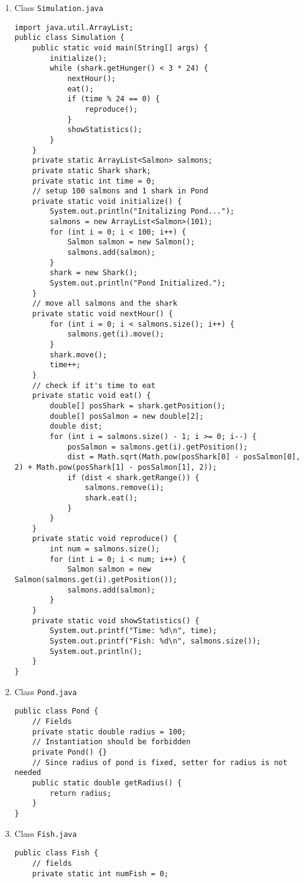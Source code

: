 \begin{enumerate}
\item Class \texttt{Simulation.java}
\lstset{language=java, tabsize=2}
\begin{lstlisting}
import java.util.ArrayList;
public class Simulation {
	public static void main(String[] args) {
		initialize();
		while (shark.getHunger() < 3 * 24) {
			nextHour();
			eat();
			if (time % 24 == 0) {
				reproduce();
			}
			showStatistics();
		}
	}
	private static ArrayList<Salmon> salmons;
	private static Shark shark;
	private static int time = 0;
	// setup 100 salmons and 1 shark in Pond
	private static void initialize() {
		System.out.println("Initalizing Pond...");
		salmons = new ArrayList<Salmon>(101);
		for (int i = 0; i < 100; i++) {
			Salmon salmon = new Salmon();
			salmons.add(salmon);
		}
		shark = new Shark();
		System.out.println("Pond Initialized.");
	}
	// move all salmons and the shark
	private static void nextHour() {
		for (int i = 0; i < salmons.size(); i++) {
			salmons.get(i).move();
		}
		shark.move();
		time++;
	}
	// check if it's time to eat
	private static void eat() {
		double[] posShark = shark.getPosition();
		double[] posSalmon = new double[2];
		double dist;
		for (int i = salmons.size() - 1; i >= 0; i--) {
			posSalmon = salmons.get(i).getPosition();
			dist = Math.sqrt(Math.pow(posShark[0] - posSalmon[0], 2) + Math.pow(posShark[1] - posSalmon[1], 2));
			if (dist < shark.getRange()) {
				salmons.remove(i);
				shark.eat();
			}
		}
	}
	private static void reproduce() {
		int num = salmons.size();
		for (int i = 0; i < num; i++) {
			Salmon salmon = new Salmon(salmons.get(i).getPosition());
			salmons.add(salmon);
		}
	}
	private static void showStatistics() {
		System.out.printf("Time: %d\n", time);
		System.out.printf("Fish: %d\n", salmons.size());
		System.out.println();
	}
}
\end{lstlisting}
\item Class \texttt{Pond.java}
\lstset{language=java, tabsize=2}
\begin{lstlisting}
public class Pond {
	// Fields
	private static double radius = 100;
	// Instantiation should be forbidden
	private Pond() {}
	// Since radius of pond is fixed, setter for radius is not needed
	public static double getRadius() {
		return radius;
	}
}
\end{lstlisting}
\item Class \texttt{Fish.java}
\lstset{language=java, tabsize=2}
\begin{lstlisting}
public class Fish {
	// fields
	private static int numFish = 0;

\end{lstlisting}
\end{enumerate}
